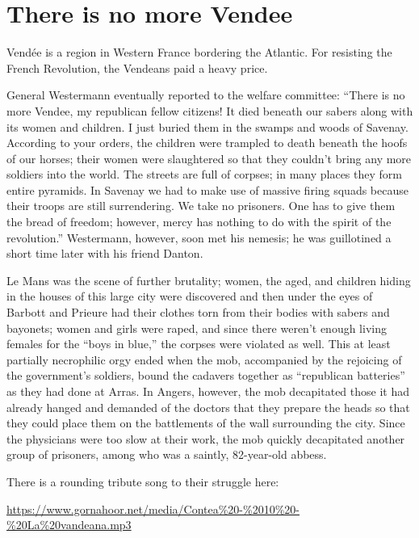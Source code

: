\section{There is no more Vendee}

Vendée is a region in Western France bordering the Atlantic. For resisting the French Revolution, the Vendeans paid a heavy price.

\begin{quotationx}
General Westermann eventually reported to the welfare committee: ``There is no more Vendee, my republican fellow citizens! It died beneath our sabers along with its women and children. I just buried them in the swamps and woods of Savenay. According to your orders, the children were trampled to death beneath the hoofs of our horses; their women were slaughtered so that they couldn't bring any more soldiers into the world. The streets are full of corpses; in many places they form entire pyramids. In Savenay we had to make use of massive firing squads because their troops are still surrendering. We take no prisoners. One has to give them the bread of freedom; however, mercy has nothing to do with the spirit of the revolution.'' Westermann, however, soon met his nemesis; he was guillotined a short time later with his friend Danton.

Le Mans was the scene of further brutality; women, the aged, and children hiding in the houses of this large city were discovered and then under the eyes of Barbott and Prieure had their clothes torn from their bodies with sabers and bayonets; women and girls were raped, and since there weren't enough living females for the ``boys in blue,'' the corpses were violated as well. This at least partially necrophilic orgy ended when the mob, accompanied by the rejoicing of the government's soldiers, bound the cadavers together as ``republican batteries'' as they had done at Arras. In Angers, however, the mob decapitated those it had already hanged and demanded of the doctors that they prepare the heads so that they could place them on the battlements of the wall surrounding the city. Since the physicians were too slow at their work, the mob quickly decapitated another group of prisoners, among who was a saintly, 82-year-old abbess.
\end{quotationx}


There is a rounding tribute song to their struggle here:

\url{https://www.gornahoor.net/media/Contea\%20-\%2010\%20-\%20La\%20vandeana.mp3}


